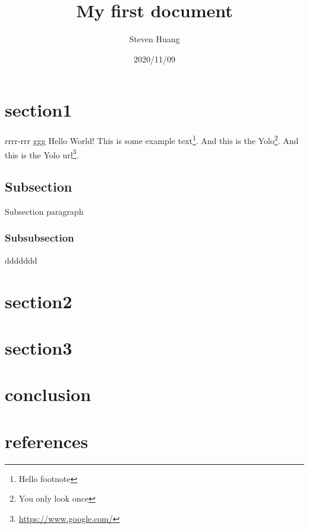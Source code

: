 \documentclass{article}
\title{ My first document}
\date{2020/11/09}
\author{Steven Huang}
\begin{document}
\maketitle
\newpage
{}

\section{section1}

rrrr-rrr {\color{red}ggg}
Hello World! This is some example text\footnote{\label{myfootnote}Hello footnote}.
And this is the Yolo\footnote{\label{aaa}You only look once}.
And this is the Yolo url\footnote{\label{bbb}\url{https://www.google.com/}}.

\subsection{Subsection}
Subsection paragraph

\subsubsection{Subsubsection}
ddddddd

\section{section2}
\section{section3}
\section{conclusion}
\section{references}
\end{document}
